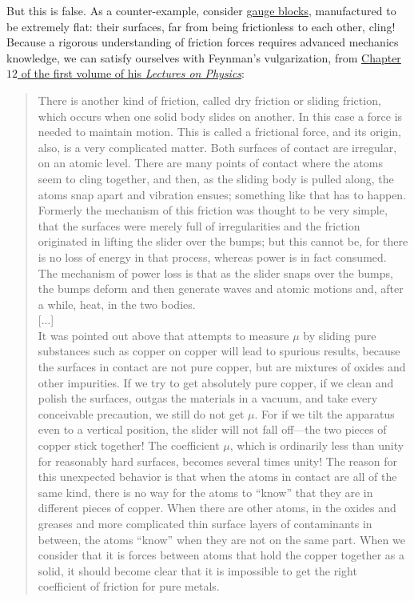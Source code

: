 \documentclass[solutions.tex]{subfiles}
\begin{document}
But this is false. As a counter-example, consider
\href{https://en.wikipedia.org/wiki/Gauge\_block}{gauge blocks},
manufactured to be extremely flat: their surfaces, far from being
frictionless to each other, cling! \\

Because a rigorous understanding of friction forces requires advanced
mechanics knowledge, we can satisfy ourselves with Feynman's vulgarization,
from \href{https://www.feynmanlectures.caltech.edu/I\_12.html}{Chapter
$12$ of the first volume of his \textit{Lectures on Physics}}:

\begin{quote}
There is another kind of friction, called dry friction or sliding friction,
which occurs when one solid body slides on another. In this case a force is
needed to maintain motion. This is called a frictional force, and its origin,
also, is a very complicated matter. Both surfaces of contact are irregular, on
an atomic level. There are many points of contact where the atoms seem to cling
together, and then, as the sliding body is pulled along, the atoms snap apart
and vibration ensues; something like that has to happen. Formerly the mechanism
of this friction was thought to be very simple, that the surfaces were merely
full of irregularities and the friction originated in lifting the slider over
the bumps; but this cannot be, for there is no loss of energy in that process,
whereas power is in fact consumed. The mechanism of power loss is that as the
slider snaps over the bumps, the bumps deform and then generate waves and
atomic motions and, after a while, heat, in the two bodies. \\

[...] \\

It was pointed out above that attempts to measure $\mu$ by
sliding pure substances such as copper on copper will lead to
spurious results, because the surfaces in contact are not pure
copper, but are mixtures of oxides and other impurities. If we
try to get absolutely pure copper, if we clean and polish the
surfaces, outgas the materials in a vacuum, and take every
conceivable precaution, we still do not get $\mu$. For if we
tilt the apparatus even to a vertical position, the slider will
not fall off—the two pieces of copper stick together! The coefficient
$\mu$, which is ordinarily less than unity for reasonably hard
surfaces, becomes several times unity! The reason for this
unexpected behavior is that when the atoms in contact are all
of the same kind, there is no way for the atoms to “know” that
they are in different pieces of copper. When there are other
atoms, in the oxides and greases and more complicated thin surface
layers of contaminants in between, the atoms “know” when they are
not on the same part. When we consider that it is forces between
atoms that hold the copper together as a solid, it should become
clear that it is impossible to get the right coefficient of
friction for pure metals.
\end{quote}
\end{document}
